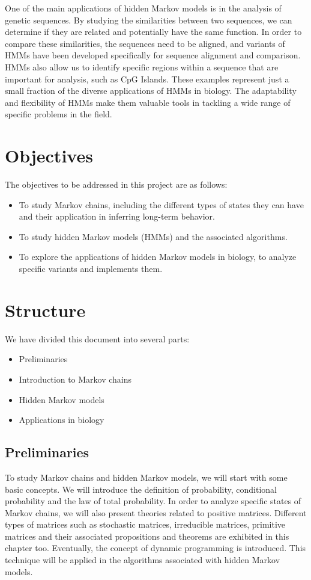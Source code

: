 One of the main applications of hidden Markov models is in the analysis of genetic sequences. By studying the similarities between two sequences, we can determine if they are related and potentially have the same function. In order to compare these similarities, the sequences need to be aligned, and variants of HMMs have been developed specifically for sequence alignment and comparison. HMMs also allow us to identify specific regions within a sequence that are important for analysis, such as CpG Islands. These examples represent just a small fraction of the diverse applications of HMMs in biology. The adaptability and flexibility of HMMs make them valuable tools in tackling a wide range of specific problems in the field.

\section*{Objectives}
The objectives to be addressed in this project are as follows:
\begin{itemize}
    \item To study Markov chains, including the different types of states they can have and their application in inferring long-term behavior.
    \item To study hidden Markov models (HMMs) and the associated algorithms.
    \item To explore the applications of hidden Markov models in biology, to analyze specific variants and implements them.
\end{itemize}

\section*{Structure}
We have divided this document into several parts:
\begin{itemize}
    \item Preliminaries
    \item Introduction to Markov chains
    \item Hidden Markov models
    \item Applications in biology
\end{itemize}

\subsection*{Preliminaries}
To study Markov chains and hidden Markov models, we will start with some basic concepts. We will introduce the definition of probability, conditional probability and the law of total probability. In order to analyze specific states of Markov chains, we will also present theories related to positive matrices. Different types of matrices such as stochastic matrices, irreducible matrices, primitive matrices and their associated propositions and theorems are exhibited in this chapter too. Eventually, the concept of dynamic programming is introduced. This technique will be applied in the algorithms associated with hidden Markov models.

